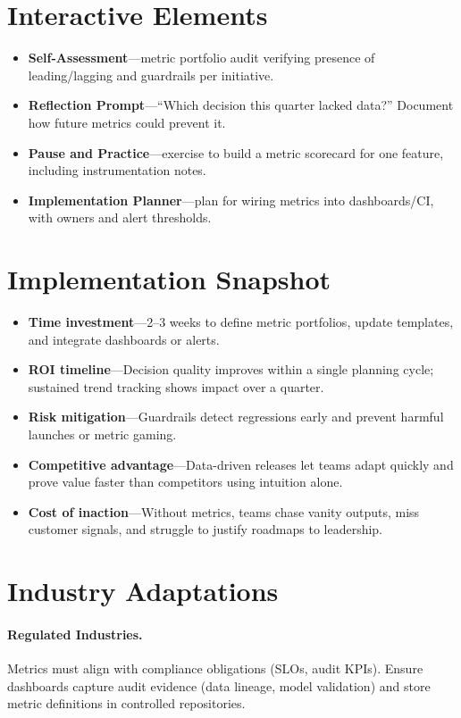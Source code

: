 \section{Interactive Elements}
\label{sec:metrics-interactive}
\begin{itemize}
    \item \textbf{Self-Assessment}—metric portfolio audit verifying presence of leading/lagging and guardrails per initiative.
    \item \textbf{Reflection Prompt}—``Which decision this quarter lacked data?'' Document how future metrics could prevent it.
    \item \textbf{Pause and Practice}—exercise to build a metric scorecard for one feature, including instrumentation notes.
    \item \textbf{Implementation Planner}—plan for wiring metrics into dashboards/CI, with owners and alert thresholds.
\end{itemize}

\section{Implementation Snapshot}
\label{sec:metrics-snapshot}
\begin{itemize}
    \item \textbf{Time investment}—2--3 weeks to define metric portfolios, update templates, and integrate dashboards or alerts.
    \item \textbf{ROI timeline}—Decision quality improves within a single planning cycle; sustained trend tracking shows impact over a quarter.
    \item \textbf{Risk mitigation}—Guardrails detect regressions early and prevent harmful launches or metric gaming.
    \item \textbf{Competitive advantage}—Data-driven releases let teams adapt quickly and prove value faster than competitors using intuition alone.
    \item \textbf{Cost of inaction}—Without metrics, teams chase vanity outputs, miss customer signals, and struggle to justify roadmaps to leadership.
\end{itemize}
\section{Industry Adaptations}
\label{sec:metrics-industry}
\paragraph{Regulated Industries.} Metrics must align with compliance obligations (SLOs, audit KPIs). Ensure dashboards capture audit evidence (data lineage, model validation) and store metric definitions in controlled repositories.

